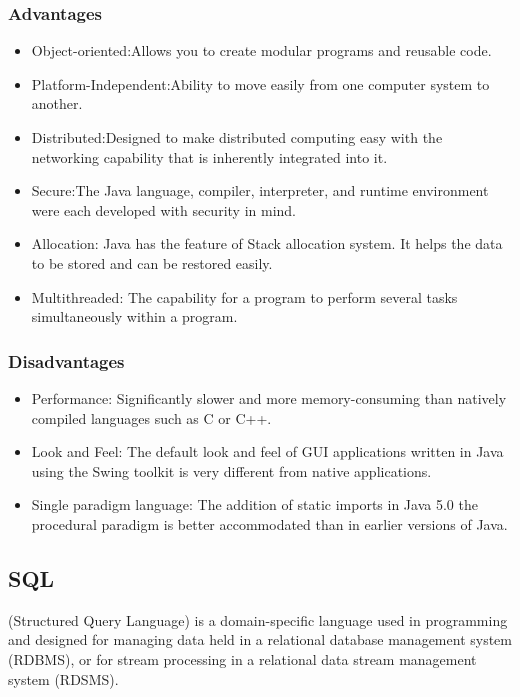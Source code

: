 \documentclass[a4paper, hidelinks, 12pt]{report}
\begin{document}
	\subsubsection{Advantages}
	\begin{itemize}
	\item{Object-oriented}:Allows you to create modular programs and reusable code. 
	\item{Platform-Independent}:Ability to move easily from one computer system to another. 
		\item{Distributed}:Designed to make distributed computing easy with the networking capability that is inherently integrated into it.
		\item{Secure}:The Java language, compiler, interpreter, and runtime environment were each developed with security in mind.
		\item{Allocation}: Java has the feature of Stack allocation system. It helps the data to be stored and can be restored easily.
		\item{Multithreaded}: The capability for a program to perform several tasks simultaneously within a program.
	\end{itemize}
	\subsubsection{Disadvantages}
	\begin{itemize}
	\item{Performance}: Significantly slower and more memory-consuming than natively compiled languages such as C or C++.
	\item{Look and Feel}: The default look and feel of GUI applications written in Java using the Swing toolkit is very different from native applications.
		\item{Single paradigm language}: The addition of static imports in Java 5.0 the procedural paradigm is better accommodated than in earlier versions of Java.
	\end{itemize}
	
	\subsection{SQL}(Structured Query Language) is a domain-specific language used in programming and designed for managing data held in a relational database management system (RDBMS), or for stream processing in a relational data stream management system (RDSMS). 
\end{document}
